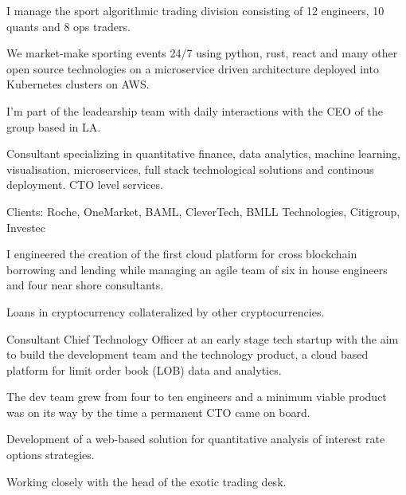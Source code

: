 
I manage the sport algorithmic trading division consisting of 12 engineers, 10 quants and 8 ops traders.

We market-make sporting events 24/7 using python, rust, react and many other open source technologies on a microservice driven architecture
deployed into Kubernetes clusters on AWS.

I'm part of the leadearship team with daily interactions with the CEO of the group based in LA.



Consultant specializing in quantitative finance, data analytics, machine learning, visualisation, microservices, full stack technological solutions and continous deployment. CTO level services.

Clients: Roche, OneMarket, BAML, CleverTech, BMLL Technologies, Citigroup, Investec



I engineered the creation of the first cloud platform for cross blockchain borrowing and lending
while managing an agile team of six in house engineers and four near shore consultants.

Loans in cryptocurrency collateralized by other cryptocurrencies.



Consultant Chief Technology Officer at an early stage tech startup with the aim to build the development team and the technology product,
a cloud based platform for limit order book (LOB) data and analytics.

The dev team grew from four to ten engineers and a minimum viable product was on its way by the time a permanent CTO came on board.


Development of a web-based solution for quantitative analysis of interest rate options strategies.

Working closely with the head of the exotic trading desk.


